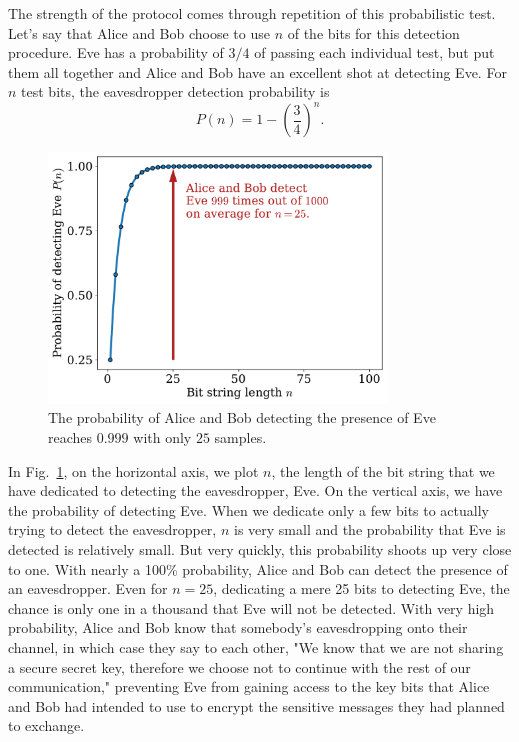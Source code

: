 The strength of the protocol comes through repetition of this probabilistic test.  Let's say that Alice and Bob choose to use $n$ of the bits for this detection procedure.  Eve has a probability of $3/4$ of passing each individual test, but put them all together and Alice and Bob have an excellent shot at detecting Eve.  For $n$ test bits, the eavesdropper detection probability is
\begin{equation}
P(n)=1-\left(\frac{3}{4}\right)^n.
\end{equation}

\begin{figure}[H]
    \centering
    \includegraphics[width=0.8\textwidth]{lesson9/9-4_detection.pdf}
        \caption[Probability of detecting the presence of Eve]{The probability of Alice and Bob detecting the presence of Eve reaches $0.999$ with only $25$ samples.}
    \label{fig:catching-eve}
\end{figure}

In Fig.~\ref{fig:catching-eve}, on the horizontal axis, we plot $n$, the length of the bit string that we have dedicated to detecting the eavesdropper, Eve. On the vertical axis, we have the probability of detecting Eve.  When we dedicate only a few bits to actually trying to detect the eavesdropper, $n$ is very small and the probability that Eve is detected is relatively small. But very quickly, this probability shoots up very close to one. With nearly a 100\% probability, Alice and Bob can detect the presence of an eavesdropper. Even for $n = 25$, dedicating a mere 25 bits to detecting Eve, the chance is only one in a thousand that Eve will not be detected.  With very high probability, Alice and Bob know that somebody's eavesdropping onto their channel, in which case they say to each other, "We know that we are not sharing a secure secret key, therefore we choose not to continue with the rest of our communication," preventing Eve from gaining access to the key bits that Alice and Bob had intended to use to encrypt the sensitive messages they had planned to exchange.

